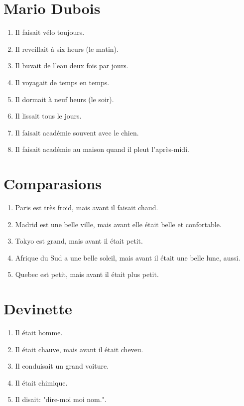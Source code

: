 \section*{Mario Dubois}

\begin{enumerate}
    \item Il faisait vélo toujours.
    \item Il reveillait à six heurs (le matin).
    \item Il buvait de l'eau deux fois par jours.
    \item Il voyagait de temps en temps.
    \item Il dormait à neuf heurs (le soir).
    \item Il lissait tous le jours.
    \item Il faisait académie souvent avec le chien.
    \item Il faisait académie au maison quand il pleut l'après-midi.
\end{enumerate}

\section*{Comparasions}

\begin{enumerate}
    \item Paris est très froid, mais avant il faisait chaud.
    \item Madrid est une belle ville, mais avant elle était belle et confortable.
    \item Tokyo est grand, mais avant il était petit.
    \item Afrique du Sud a une belle soleil, mais avant il était une belle lune, aussi.
    \item Quebec est petit, mais avant il était plus petit.
\end{enumerate}

\section*{Devinette}

\begin{enumerate}
    \item Il était homme.
    \item Il était chauve, mais avant il était cheveu.
    \item Il conduisait un grand voiture.
    \item Il était chimique.
    \item Il disait: "dire-moi moi nom.".
\end{enumerate}